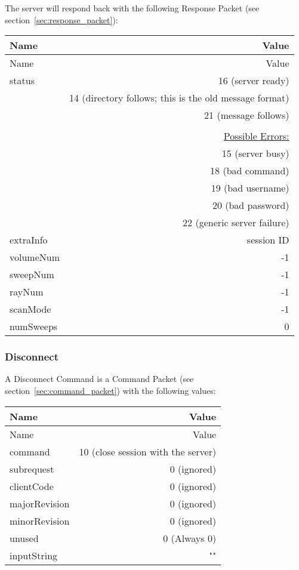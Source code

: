\documentclass[10pt]{article}
\newcommand{\tblspc}{\rule{0pt}{3ex}}
\begin{document}
The server will respond back with the following Response Packet (see section~\ref{sec:response_packet}):
\begin{longtable}{|l|r|}
\hline Name & Value \\ \hline \endfirsthead
\hline Name & Value \\ \hline \endhead
\hline \endfoot
\tblspc status & 16 (server ready) \\
& 14 (directory follows; this is the old message format) \\
& 21 (message follows) \\
& \\
& \underline{Possible Errors:} \\
& 15 (server busy) \\
& 18 (bad command) \\
& 19 (bad username) \\
& 20 (bad password) \\
& 22 (generic server failure) \\
\hline
\tblspc extraInfo & session ID \\
\hline
\tblspc volumeNum & -1 \\
\hline
\tblspc sweepNum & -1 \\
\hline
\tblspc rayNum & -1 \\
\hline
\tblspc scanMode & -1 \\
\hline
\tblspc numSweeps & 0 \\
\hline
\end{longtable}
\newpage

\subsubsection{Disconnect}
\label{sec:disconnect}
A Disconnect Command is a Command Packet (see section~\ref{sec:command_packet}) with the following values:
\begin{longtable}{|l|r|}
\hline Name & Value \\ \hline \endfirsthead
\hline Name & Value \\ \hline \endhead
\hline \endfoot
\tblspc command & 10 (close session with the server) \\
\hline
\tblspc subrequest & 0 (ignored) \\
\hline
\tblspc clientCode & 0 (ignored) \\
\hline
\tblspc majorRevision & 0 (ignored) \\
\hline
\tblspc minorRevision & 0 (ignored) \\
\hline
\tblspc unused & 0 (Always 0) \\
\hline
\tblspc inputString & "" \\
\hline
\end{longtable}
\end{document}
